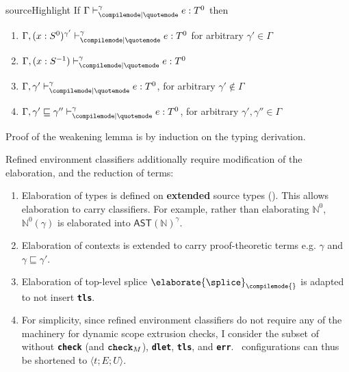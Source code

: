 \begin{lemma}{sourceHighlight}
  If $\rcqtypejudge{\gamma}{e}{T^0}$ then
  \begin{enumerate}
    \item $\rcqtypejudge[\Gamma, (x:S^0)^{\gamma'}]{\gamma}{e}{T^0}$ for arbitrary $\gamma' \in \Gamma$
    \item $\rcqtypejudge[\Gamma, (x:S^{-1})]{\gamma}{e}{T^0}$ 
    \item $\rcqtypejudge[\Gamma, \gamma']{\gamma}{e}{T^0}$, for arbitrary $\gamma' \notin \Gamma$
    \item $\rcqtypejudge[\Gamma, \gamma' \sqsubseteq \gamma'']{\gamma}{e}{T^0}$, for arbitrary $\gamma', \gamma'' \in \Gamma$
  \end{enumerate}
\end{lemma}
Proof of the weakening lemma is by induction on the typing derivation.

Refined environment classifiers additionally require modification of the elaboration, and the reduction of \coreLang{} terms:

\begin{enumerate}
  \item Elaboration of types is defined on \textbf{extended} source types (). This allows elaboration to carry classifiers. For example, rather than elaborating $\mathbb{N}^0$, $\mathbb{N}^0(\gamma)$ is elaborated into $\textsf{AST}(\mathbb{N})^{\gamma}$.
  \item Elaboration of contexts is extended to carry proof-theoretic terms e.g. $\gamma$ and $\gamma \sqsubseteq \gamma'$.
  \item Elaboration of top-level splice $\elaborate{\splice}_{\compilemode{}}$ is adapted to not insert \textbf{\texttt{tls}}.
  \item For simplicity, since refined environment classifiers do not require any of the machinery for dynamic scope extrusion checks, I consider the subset of \coreLang{} without \textbf{\texttt{check}} (and $\textbf{\texttt{check}}_M$), \textbf{\texttt{dlet}}, \textbf{\texttt{tls}}, and \textbf{\texttt{err}}.\ \coreLang{} configurations can thus be shortened to $\langle t;E;U\rangle$.
\end{enumerate}

